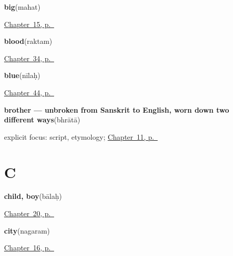 \noindent\begin{minipage}[t]{\linewidth}
\raggedright
\textbf{big}\enspace\emph{}\enspace(mahat)\par
\footnotesize \hyperref[ch:sa-describing-things]{Chapter~15, p.~\pageref*{ch:sa-describing-things}}
\end{minipage}\par\smallskip

\noindent\begin{minipage}[t]{\linewidth}
\raggedright
\textbf{blood}\enspace\emph{}\enspace(raktam)\par
\footnotesize \hyperref[ch:sa-limbs]{Chapter~34, p.~\pageref*{ch:sa-limbs}}
\end{minipage}\par\smallskip

\noindent\begin{minipage}[t]{\linewidth}
\raggedright
\textbf{blue}\enspace\emph{}\enspace(nīlaḥ)\par
\footnotesize \hyperref[ch:sa-colours]{Chapter~44, p.~\pageref*{ch:sa-colours}}
\end{minipage}\par\smallskip

\noindent\begin{minipage}[t]{\linewidth}
\raggedright
\textbf{brother — unbroken from Sanskrit to English, worn down two different ways}\enspace\emph{}\enspace(bhrātā)\par
\footnotesize explicit focus: script, etymology; \hyperref[ch:sa-people-nouns]{Chapter~11, p.~\pageref*{ch:sa-people-nouns}}
\end{minipage}\par\smallskip

\section*{C}

\noindent\begin{minipage}[t]{\linewidth}
\raggedright
\textbf{child, boy}\enspace\emph{}\enspace(bālaḥ)\par
\footnotesize \hyperref[ch:sa-people]{Chapter~20, p.~\pageref*{ch:sa-people}}
\end{minipage}\par\smallskip

\noindent\begin{minipage}[t]{\linewidth}
\raggedright
\textbf{city}\enspace\emph{}\enspace(nagaram)\par
\footnotesize \hyperref[ch:sa-places]{Chapter~16, p.~\pageref*{ch:sa-places}}
\end{minipage}\par\smallskip

